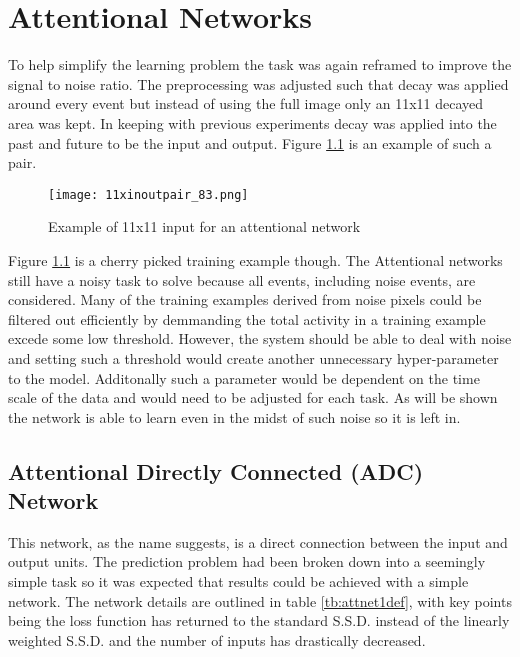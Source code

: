 \chapter{Attentional Networks}
\label{ch:attentional}
To help simplify the learning problem the task was again reframed to improve the signal to noise ratio.
The preprocessing was adjusted such that decay was applied around every event but instead of using the full image only an 11x11 decayed area was kept.
In keeping with previous experiments decay was applied into the past and future to be the input and output. 
Figure \ref{fig:11inoutpair} is an example of such a pair.

\begin{figure}[h]
    \centering
    \texttt{[image: 11xinoutpair\_83.png]}
    \caption{Example of 11x11 input for an attentional network}
    \label{fig:11inoutpair}
\end{figure}

Figure \ref{fig:11inoutpair} is a cherry picked training example though.
The Attentional networks still have a noisy task to solve because all events, including noise events, are considered. 
Many of the training examples derived from noise pixels could be filtered out efficiently by demmanding the total activity in a training example excede some low threshold.
However, the system should be able to deal with noise and setting such a threshold would create another unnecessary hyper-parameter to the model.
Additonally such a parameter would be dependent on the time scale of the data and would need to be adjusted for each task. 
As will be shown the network is able to learn even in the midst of such noise so it is left in. 

\section{Attentional Directly Connected (ADC) Network}
This network, as the name suggests, is a direct connection between the input and output units.
The prediction problem had been broken down into a seemingly simple task so it was expected that results could be achieved with a simple network. 
The network details are outlined in table \ref{tb:attnet1def}, with key points being the loss function has returned to the standard S.S.D. instead of the linearly weighted S.S.D. and the number of inputs has drastically decreased. 

